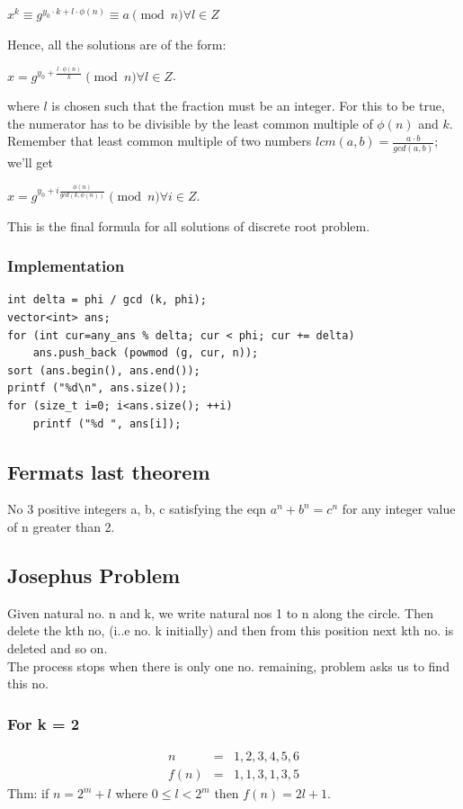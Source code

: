 \documentclass[8pt, a4paper, oneside, twocolumn]{extarticle}
\begin{document}
$x^k \equiv g^{ y_0 \cdot k + l \cdot \phi (n)} \equiv a \pmod n \forall l \in Z$

Hence, all the solutions are of the form:

$x = g^{y_0 + \frac {l \cdot \phi (n)}{k}} \pmod n \forall l \in Z$.

where $l$ is chosen such that the fraction must be an integer. For this to be true, the numerator has to be divisible by the least common multiple of $\phi (n)$ and $k$. Remember that least common multiple of two numbers $lcm(a, b) = \frac{a \cdot b}{gcd(a, b)}$; we'll get

$x = g^{y_0 + i \frac {\phi (n)}{gcd(k, \phi (n))}} \pmod n \forall i \in Z$.

This is the final formula for all solutions of discrete root problem.
\subsubsection{Implementation}
\begin{verbatim}
int delta = phi / gcd (k, phi);
vector<int> ans;
for (int cur=any_ans % delta; cur < phi; cur += delta)
    ans.push_back (powmod (g, cur, n));
sort (ans.begin(), ans.end());
printf ("%d\n", ans.size());
for (size_t i=0; i<ans.size(); ++i)
    printf ("%d ", ans[i]);
\end{verbatim}
\subsection{Fermats last theorem}
No 3 positive integers a, b, c satisfying the eqn $a^n + b^n = c^n$ for any integer value of n greater than 2.
\subsection{Josephus Problem}
Given natural no. n and k, we write natural nos 1 to n along the circle. Then delete the kth no, (i..e no. k initially) and then from this position next kth no. is deleted and so on.
\\The process stops when there is only one no. remaining, problem asks us to find this no.
\subsubsection{For k = 2}
\begin{eqnarray}n & = & 1, 2, 3, 4, 5, 6\\
f(n) & = & 1, 1, 3, 1, 3, 5
\end{eqnarray}
Thm: if $n = 2^m + l$ where $0 \leq l < 2^m$ then $f(n) = 2l + 1$.
\end{document}
